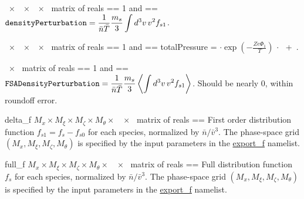 \myhrule

{~$\times$~~$\times$~~$\times$~ matrix of reals}
{ == 1 and  == \true}
{$\displaystyle \text{\ttfamily densityPerturbation} =  \frac{1}{\bar{n} \bar{T}} \frac{m_s}{3} \int d^3v \, v^2 f_{s1}$.}

\myhrule

{~$\times$~~$\times$~~$\times$~ matrix of reals}
{ == 1 and  == \true}
{{\ttfamily totalPressure} = $\cdot \exp \left(- \frac{Z e \Phi_1}{T}  \right)$ $\cdot$ ~+~.}

\myhrule

{~$\times$~ matrix of reals}
{ == 1 and  == \true}
{$\displaystyle \text{\ttfamily FSADensityPerturbation} =  \frac{1}{\bar{n} \bar{T}} \frac{m_s}{3} \left\langle \int d^3v \, v^2 f_{s1} \right\rangle$. 
Should be %
nearly 0, within roundoff error.}

\myhrule

{delta_f}
{$M_x \times M_{\xi} \times M_{\zeta} \times M_{\theta} \times$~~$\times$~ matrix of reals}
{ == \true}
{First order distribution function $f_{s1} = f_{s} - f_{s0}$ for each species, normalized by $\bar{n} / \bar{v}^3$. 
The phase-space grid $\left(M_x, M_{\xi}, M_{\zeta}, M_{\theta}\right)$} is specified by the input parameters in the {\ttfamily \hyperref[sec:exportfParameters]{export\_f}} namelist. 

\myhrule

{full_f}
{$M_x \times M_{\xi} \times M_{\zeta} \times M_{\theta} \times$~~$\times$~ matrix of reals}
{ == \true}
{Full distribution function $f_{s}$ for each species, normalized by $\bar{n} / \bar{v}^3$. 
The phase-space grid $\left(M_x, M_{\xi}, M_{\zeta}, M_{\theta}\right)$} is specified by the input parameters in the {\ttfamily \hyperref[sec:exportfParameters]{export\_f}} namelist. 

\myhrule

